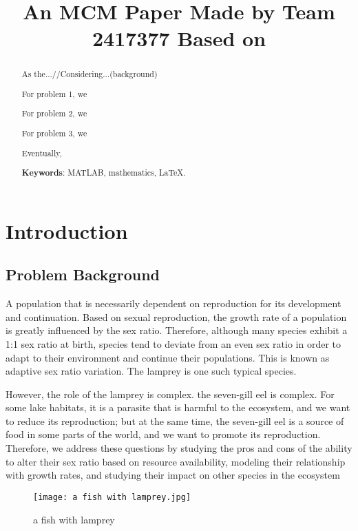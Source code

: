 \documentclass[12pt]{article}  %
\title{An MCM Paper Made by Team 2417377 Based on}  %
\begin{document}
\begin{abstract}
    As the...//Considering...(background)

    For problem 1, we

    For problem 2, we 

    For problem 3, we
    
    Eventually,  

    \vspace{5pt}
    \textbf{Keywords}: MATLAB, mathematics, \LaTeX.

\end{abstract}

\maketitle  %
\tableofcontents  %


\section{Introduction}
\subsection{Problem Background}
A population that is necessarily dependent on reproduction for its development and continuation. Based on sexual reproduction, the growth rate of a population is greatly influenced by the sex ratio. Therefore, although many species exhibit a 1:1 sex ratio at birth, species tend to deviate from an even sex ratio in order to adapt to their environment and continue their populations. This is known as adaptive sex ratio variation.\cite{1} The lamprey is one such typical species.

However, the role of the lamprey is complex. the seven-gill eel is complex. For some lake habitats, it is a parasite that is harmful to the ecosystem, and we want to reduce its reproduction; but at the same time, the seven-gill eel is a source of food in some parts of the world, and we want to promote its reproduction.\cite{2} Therefore, we address these questions by studying the pros and cons of the ability to alter their sex ratio based on resource availability, modeling their relationship with growth rates, and studying their impact on other species in the ecosystem

\begin{figure}[htbp]
	\centering
	\texttt{[image: a fish with lamprey.jpg]}
	\caption{a fish with lamprey}\label{fig:001}
\end{figure}
\end{document}
